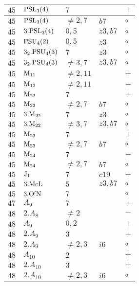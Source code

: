 \documentclass[a4paper, 11pt]{article}
\begin{document}
\begin{longtable}{lllll}
		$45$ & ${\rm PSL}_{3}(4)$ & $7$ & & $+$ \\ \hline
		$45$ & ${\rm PSL}_{3}(4)$ & $\neq 2,7$ & $b7$ & $\circ$ \\ \hline
		$45$ & $3.{\rm PSL}_{3}(4)$ & $0,5$ & $z3, b7$ & $\circ$ \\ \hline
		$45$ & ${\rm PSU}_{4}(2)$ & $0,5$ & $z3$ & $\circ$ \\ \hline
		$45$ & $3_2.{\rm PSU}_{4}(3)$ & $7$ & $z3$ & $\circ$ \\ \hline
		$45$ & $3_2.{\rm PSU}_{4}(3)$ & $\neq 3,7$ & $z3, b7$ & $\circ$ \\ \hline
		$45$ & ${\rm M}_{11}$ & $\neq 2,11$ & & $+$ \\ \hline
		$45$ & ${\rm M}_{12}$ & $\neq 2,11$ & & $+$ \\ \hline
		$45$ & ${\rm M}_{22}$ & $7$ & & $+$ \\ \hline
		$45$ & ${\rm M}_{22}$ & $\neq 2,7$ & $b7$ & $\circ$ \\ \hline
		$45$ & $3.{\rm M}_{22}$ & $7$ & $z3$ & $\circ$ \\ \hline
		$45$ & $3.{\rm M}_{22}$ & $\neq 3,7$ & $z3, b7$ & $\circ$ \\ \hline
		$45$ & ${\rm M}_{23}$ & $7$ & & $+$ \\ \hline
		$45$ & ${\rm M}_{23}$ & $\neq 2,7$ & $b7$ & $\circ$ \\ \hline
		$45$ & ${\rm M}_{24}$ & $7$ & & $+$ \\ \hline
		$45$ & ${\rm M}_{24}$ & $\neq 2,7$ & $b7$ & $\circ$ \\ \hline
		$45$ & ${\rm J}_1$ & $7$ & $c19$ & $+$ \\ \hline
		$45$ & $3.{\rm McL}$ & $5$ & $z3, b7$ & $\circ$ \\ \hline
		$45$ & $3.{\rm {\rm O'N}}$ & $7$ &  & $\circ$ \\ \hline
		$47$ & $A_{9}$ & $7$ &  & $+$ \\ \hline
		$48$ & $2.A_{8}$ & $\neq 2$ &  & $-$ \\ \hline
		$48$ & $A_{9}$ & $0,2$ &  & $+$ \\ \hline
		$48$ & $2.A_{9}$ & $3$ &  & $+$ \\ \hline
		$48$ & $2.A_{9}$ & $\neq 2,3$ & $i6$ & $\circ$ \\ \hline
		$48$ & $A_{10}$ & $2$ &  & $+$ \\ \hline
		$48$ & $2.A_{10}$ & $3$ &  & $+$ \\ \hline
		$48$ & $2.A_{10}$ & $\neq 2,3$ & $i6$ & $\circ$ \\ \hline

\end{longtable}
\end{document}
